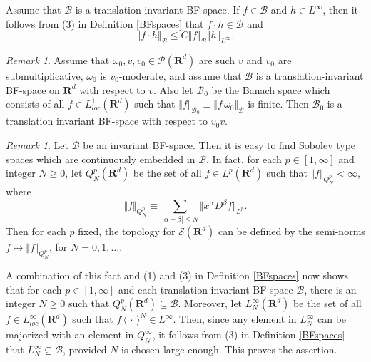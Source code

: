 \documentclass[12pt,a4paper,reqno]{amsart}
\numberwithin{equation}{section}
\numberwithin{thm}{section}
\theoremstyle{definition}
\theoremstyle{remark}
\newtheorem{rem}[thm]{Remark}
\begin{document}
\par

Assume that $\mathscr B$ is a translation invariant BF-space. If $f\in
\mathscr B$ and $h\in L^\infty$, then it follows from (3) in
Definition \ref{BFspaces} that $f\cdot h\in \mathscr B$ and
\begin{equation}\label{multprop}
{\Vert {f\cdot h}\Vert _{{\mathscr B}}}\le C{\Vert f\Vert _{{\mathscr B}}}{\Vert h\Vert _{{L^\infty}}}.
\end{equation}

\par

\begin{rem}\label{newbfspaces}
Assume that $\omega _0,v,v_0\in \mathscr P({\mathbf R^{d}})$ are such $v$ and
$v_0$ are submultiplicative,
$\omega _0$ is $v_0$-moderate, and assume that $\mathscr B$ is a
translation-invariant BF-space on ${\mathbf R^{d}}$ with respect to $v$. Also
let $\mathscr B_0$ be the Banach space which consists of all $f\in
L^1_{loc}({\mathbf R^{d}})$ such that ${\Vert f\Vert _{{\mathscr B_0}}}\equiv {\Vert {f\, \omega _0
}\Vert _{{\mathscr B}}}$ is finite. Then $\mathscr B_0$ is a translation
invariant BF-space with respect to $v_0v$.
\end{rem}

\par

\begin{rem}\label{BFemb}
Let $\mathscr B$ be an invariant BF-space. Then it is easy to find
Sobolev type spaces which are continuously embedded in $\mathscr
B$. In fact, for each $p\in [1,\infty ]$ and integer $N\ge 0$, let
$Q^p_N({\mathbf R^{d}})$ be the set of all $f\in L^p({\mathbf R^{d}})$ such that ${\Vert f\Vert _{{Q^p_N}}}<\infty$, where
$$
{\Vert f\Vert _{{Q^p_N}}}\equiv \sum _{|\alpha +\beta |\le N}{\Vert {x^\alpha
D^\beta f}\Vert _{{L^p}}}.
$$
Then for each $p$ fixed, the topology for $\mathscr S({\mathbf R^{d}})$ can be
defined by the semi-norms $f\mapsto {\Vert f\Vert _{{Q^p_N}}}$, for $N=0,1,\dots
$.

\par

A combination of this fact and (1) and (3) in Definition
\ref{BFspaces} now shows that for each $p\in [1,\infty ]$ and each
translation invariant BF-space $\mathscr B$, there is an integer $N\ge
0$ such that $Q^p_N({\mathbf R^{d}})\subseteq \mathscr B$. Moreover, let
$L^\infty _N({\mathbf R^{d}})$ be the set of all $f\in L^\infty _{loc}({\mathbf R^{d}})$
such that $f\, {\langle {\, \cdot \, }\rangle} ^N\in L^\infty$. Then, since any
element in $L^\infty _N$ can be majorized with an element in
$Q^\infty _N$, it follows from (3) in Definition \ref{BFspaces} that
$L^\infty _N\subseteq \mathscr B$, provided $N$ is chosen large
enough. This proves the assertion.
\end{rem}
\end{document}
